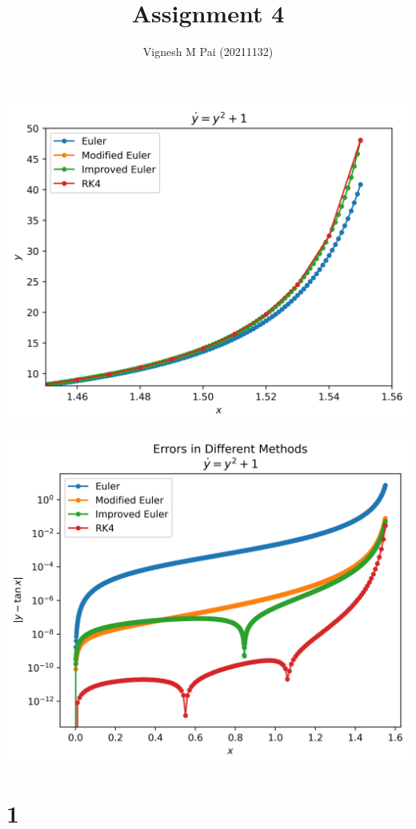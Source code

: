 \documentclass{article}
\title{Assignment 4}
\author{Vignesh M Pai (20211132)}
\date{}
\begin{document}
\maketitle

\begin{center}
    \includegraphics*[scale=0.8]{1a.png}
\end{center}

\begin{center}
    \includegraphics*[scale=0.8]{1b.png}
\end{center}

\section*{1}
\end{document}

